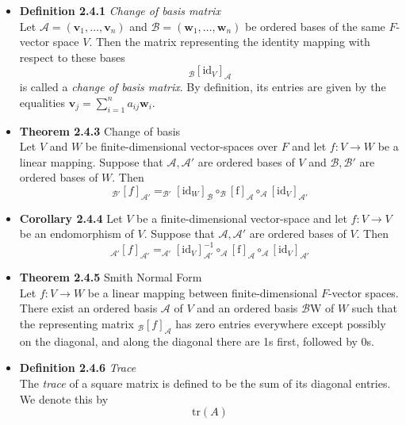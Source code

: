 \documentclass[11pt,a4paper]{article}
\begin{document}
\begin{itemize}

    \item \textbf{Definition 2.4.1} \emph{Change of basis matrix} \\
        Let $\mathcal{A} = (\textbf{v}_1, \ldots, \textbf{v}_n)$ and $\mathcal{B} =
        (\textbf{w}_1, \ldots, \textbf{w}_n)$
        be ordered bases of the same $F$-vector space $V$.
        Then the matrix representing the identity mapping with respect to these bases
        \[
            _\mathcal{B}{[\mathrm{id}_V]}_\mathcal{A}
        \]
        is called a \emph{change of basis matrix}.
        By definition, its entries are given by the equalities $\textbf{v}_j =
        \sum_{i=1}^n a_{ij}\textbf{w}_i$.

    \item \textbf{Theorem 2.4.3} Change of basis \\
        Let $V$ and $W$ be finite-dimensional vector-spaces over $F$ and let $f : V \to W$
        be a linear mapping.
        Suppose that $\mathcal{A, A'}$ are ordered bases of $V$ and $\mathcal{B, B'}$
        are ordered bases of $W$.
        Then
        \[
            _\mathcal{B'}{[f]}_\mathcal{A'} = _\mathcal{B'}{[\mathrm{id}_W]}_\mathcal{B} \circ
            _\mathcal{B}{[\mathrm{f}]}_\mathcal{A} \circ
            _\mathcal{A}{[\mathrm{id}_V]}_\mathcal{A'}
        \]

    \item \textbf{Corollary 2.4.4}
        Let $V$ be a finite-dimensional vector-space and let
        $f : V \to V$ be an endomorphism of $V$.
        Suppose that $\mathcal{A, A'}$ are ordered bases of $V$.
        Then
        \[
            _\mathcal{A'}{[f]}_\mathcal{A'} = _\mathcal{A'}{[\mathrm{id}_V]}^{-1}_\mathcal{A'}
            \circ _\mathcal{A}{[\mathrm{f}]}_\mathcal{A} \circ _\mathcal{A}
            {[\mathrm{id}_V]}_\mathcal{A'}
        \]

    \item \textbf{Theorem 2.4.5} Smith Normal Form \\
        Let $f : V \to W$ be a linear mapping between finite-dimensional $F$-vector spaces.
        There exist an ordered basis $\mathcal{A}$ of $V$ and an ordered basis
        $\mathcal{B}$W of $W$
        such that the representing matrix $_\mathcal{B}{[f]}_\mathcal{A}$
        has zero entries everywhere except possibly on the diagonal,
        and along the diagonal there are 1s first, followed by 0s.

    \item \textbf{Definition 2.4.6} \emph{Trace} \\
        The \emph{trace} of a square matrix is defined to be the sum of its diagonal entries.
        We denote this by
        \[
            \mathrm{tr}(A)
        \]

\end{itemize}
\end{document}
